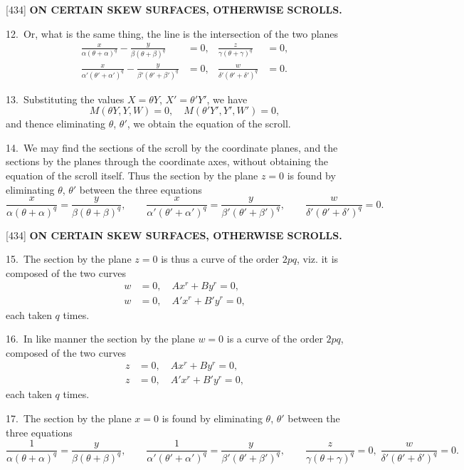 \documentclass[12pt,a4paper]{article}
\newcommand{\paperref}[1]{\textup{[#1]}}
\theoremstyle{definition}
\begin{document}
\newpage
\setcounter{page}{62}

\noindent\paperref{434}\quad
\textbf{ON CERTAIN SKEW SURFACES, OTHERWISE SCROLLS.}

12.~Or, what is the same thing, the line is the intersection of the two planes
\begin{align*}
\frac{x}{\alpha(\theta + \alpha)^q} - \frac{y}{\beta(\theta + \beta)^q} &= 0,
& \frac{z}{\gamma(\theta + \gamma)^q} &= 0,\\
\frac{x}{\alpha'(\theta' + \alpha')^q} - \frac{y}{\beta'(\theta' + \beta')^q} &= 0,
& \frac{w}{\delta'(\theta' + \delta')^q} &= 0.
\end{align*}

13.~Substituting the values $X = \theta Y$, $X' = \theta' Y'$, we have
\[
M(\theta Y, Y, W) = 0, \quad M(\theta' Y', Y', W') = 0,
\]
and thence eliminating $\theta$, $\theta'$, we obtain the equation of the scroll.

14.~We may find the sections of the scroll by the coordinate planes, and the sections by the planes through the coordinate axes, without obtaining the equation of the scroll itself. Thus the section by the plane $z = 0$ is found by eliminating $\theta$, $\theta'$ between the three equations
\[
\frac{x}{\alpha(\theta + \alpha)^q} = \frac{y}{\beta(\theta + \beta)^q},
\qquad
\frac{x}{\alpha'(\theta' + \alpha')^q} = \frac{y}{\beta'(\theta' + \beta')^q},
\qquad
\frac{w}{\delta'(\theta' + \delta')^q} = 0.
\]

\newpage
\setcounter{page}{63}

\noindent\paperref{434}\quad
\textbf{ON CERTAIN SKEW SURFACES, OTHERWISE SCROLLS.}

15.~The section by the plane $z = 0$ is thus a curve of the order $2pq$, viz. it is composed of the two curves
\begin{align*}
w &= 0, \quad Ax^r + By^r = 0,\\
w &= 0, \quad A'x^r + B'y^r = 0,
\end{align*}
each taken $q$ times.

16.~In like manner the section by the plane $w = 0$ is a curve of the order $2pq$, composed of the two curves
\begin{align*}
z &= 0, \quad Ax^r + By^r = 0,\\
z &= 0, \quad A'x^r + B'y^r = 0,
\end{align*}
each taken $q$ times.

17.~The section by the plane $x = 0$ is found by eliminating $\theta$, $\theta'$ between the three equations
\[
\frac{1}{\alpha(\theta + \alpha)^q} = \frac{y}{\beta(\theta + \beta)^q},
\qquad
\frac{1}{\alpha'(\theta' + \alpha')^q} = \frac{y}{\beta'(\theta' + \beta')^q},
\qquad
\frac{z}{\gamma(\theta + \gamma)^q} = 0,\;
\frac{w}{\delta'(\theta' + \delta')^q} = 0.
\]
\end{document}
